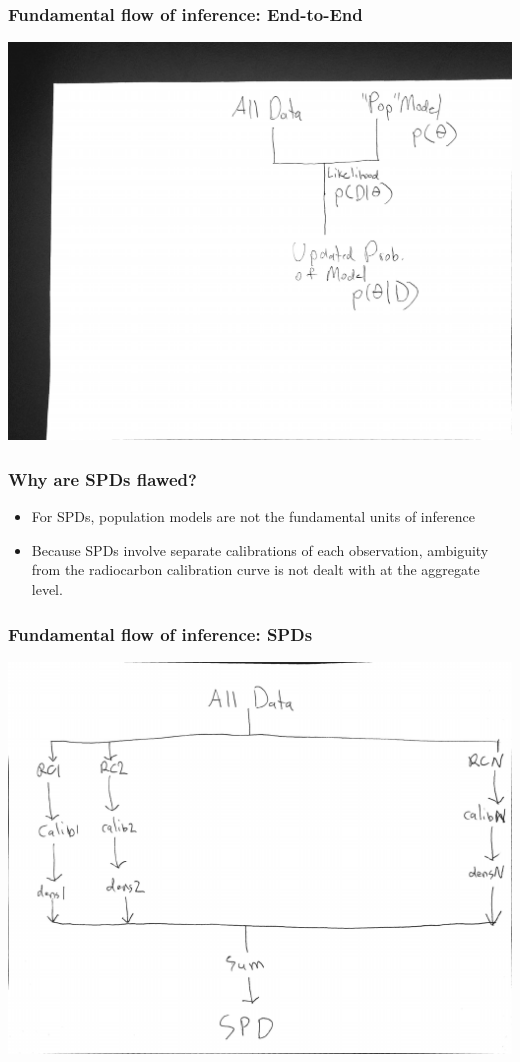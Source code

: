 \documentclass{beamer}
\begin{document}
\begin{frame}[t]
  \frametitle{Fundamental flow of inference: End-to-End}
    \includegraphics[height=.85\textheight]{e2e_flow.pdf}
\end{frame}

\begin{frame}[t]
  \frametitle{Why are SPDs flawed?}
  \begin{itemize}
    \item For SPDs, population models are not the fundamental units of inference
    \pause
    \item Because SPDs involve separate calibrations of each observation, ambiguity from the radiocarbon calibration curve is not dealt with at the aggregate level.
  \end{itemize}
\end{frame}

\begin{frame}[t]
  \frametitle{Fundamental flow of inference: SPDs}
    \includegraphics[height=.85\textheight]{spd_flow.pdf}
\end{frame}
\end{document}
